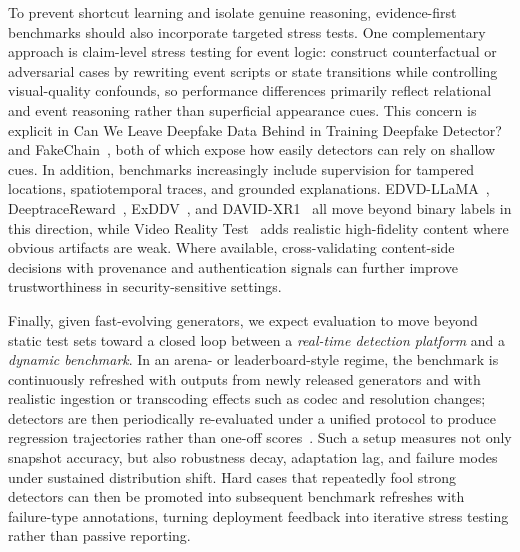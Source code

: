 To prevent shortcut learning and isolate genuine reasoning, evidence-first benchmarks should also incorporate targeted stress tests.
One complementary approach is claim-level stress testing for event logic: construct counterfactual or adversarial cases by rewriting event scripts or state transitions while controlling visual-quality confounds, so performance differences primarily reflect relational and event reasoning rather than superficial appearance cues. This concern is explicit in Can We Leave Deepfake Data Behind in Training Deepfake Detector?~\citep{cheng2024can} and FakeChain~\citep{heo2025fakechain}, both of which expose how easily detectors can rely on shallow cues.
In addition, benchmarks increasingly include supervision for tampered locations, spatiotemporal traces, and grounded explanations. EDVD-LLaMA~\citep{sun2025edvd}, DeeptraceReward~\citep{Fu2025DeeptraceReward}, ExDDV~\citep{hondru2025exddv}, and DAVID-XR1~\citep{gao2025david} all move beyond binary labels in this direction, while Video Reality Test~\citep{wang2025videorealitytestaigenerated} adds realistic high-fidelity content where obvious artifacts are weak.
Where available, cross-validating content-side decisions with provenance and authentication signals can further improve trustworthiness in security-sensitive settings.

Finally, given fast-evolving generators, we expect evaluation to move beyond static test sets toward a closed loop between a \emph{real-time detection platform} and a \emph{dynamic benchmark}.
In an arena- or leaderboard-style regime, the benchmark is continuously refreshed with outputs from newly released generators and with realistic ingestion or transcoding effects such as codec and resolution changes; detectors are then periodically re-evaluated under a unified protocol to produce regression trajectories rather than one-off scores~\citep{wang2025videorealitytestaigenerated}. Such a setup measures not only snapshot accuracy, but also robustness decay, adaptation lag, and failure modes under sustained distribution shift. Hard cases that repeatedly fool strong detectors can then be promoted into subsequent benchmark refreshes with failure-type annotations, turning deployment feedback into iterative stress testing rather than passive reporting.


